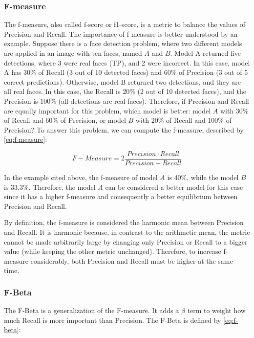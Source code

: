 \subsubsection{F-measure}

The f-measure, also called f-score or f1-score, is a metric to balance the values of Precision and Recall. The importance of f-measure is better understood by an example. Suppose there is a face detection problem, where two different models are applied in an image with ten faces, named $A$ and $B$. Model A returned five detections, where 3 were real faces (TP), and 2 were incorrect. In this case, model A has 30\% of Recall (3 out of 10 detected faces) and 60\% of Precision (3 out of 5 correct predictions). Otherwise, model B returned two detections, and they are all real faces. In this case, the Recall is 20\% (2 out of 10 detected faces), and the Precision is 100\% (all detections are real faces). Therefore, if Precision and Recall are equally important for this problem, which model is better: model $A$ with 30\% of Recall and 60\% of Precision, or model $B$ with 20\% of Recall and 100\% of Precision? To answer this problem, we can compute the f-measure, described by \autoref{eq:f-measure}: 

\begin{equation}
\label{eq:f-measure}
F{-}Measure = 2\frac{Precision \cdot Recall}{Precision + Recall}
\end{equation}

In the example cited above, the f-measure of model $A$ is 40\%, while the model $B$ is 33.3\%. Therefore, the model $A$ can be considered a better model for this case since it has a higher f-measure and consequently a better equilibrium between Precision and Recall.

By definition, the f-measure is considered the harmonic mean between Precision and Recall. It is harmonic because, in contrast to the arithmetic mean, the metric cannot be made arbitrarily large by changing only Precision or Recall to a bigger value (while keeping the other metric unchanged). Therefore, to increase f-measure considerably, both Precision and Recall must be higher at the same time.

\subsubsection{F-Beta}

The F-Beta is a generalization of the F-measure. It adds a $\beta$ term to weight how much Recall is more important than Precision. The F-Beta is defined by \autoref{eq:f-beta}:

